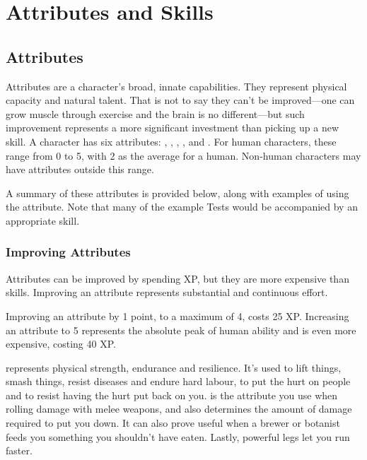 \chapter{Attributes and Skills}

\section{Attributes}

Attributes are a character's broad, innate capabilities.
They represent physical capacity and natural talent.
That is not to say they can't be improved---one can grow muscle through exercise and the brain is no different---but such improvement represents a more significant investment than picking up a new skill.
A character has six attributes: , , , ,  and .
For human characters, these range from 0 to 5, with 2 as the average for a human.
Non-human characters may have attributes outside this range.

A summary of these attributes is provided below, along with examples of using the attribute.
Note that many of the example Tests would be accompanied by an appropriate skill.

\subsection{Improving Attributes}

Attributes can be improved by spending XP, but they are more expensive than skills.
Improving an attribute represents substantial and continuous effort.

Improving an attribute by 1 point, to a maximum of 4, costs 25 XP.
Increasing an attribute to 5 represents the absolute peak of human ability and is even more expensive, costing 40 XP.


 represents physical strength, endurance and resilience.
It's used to lift things, smash things, resist diseases and endure hard labour, to put the hurt on people and to resist having the hurt put back on you.
 is the attribute you use when rolling damage with melee weapons, and also determines the amount of damage required to put you down.
It can also prove useful when a brewer or botanist feeds you something you shouldn't have eaten.
Lastly, powerful legs let you run faster.

